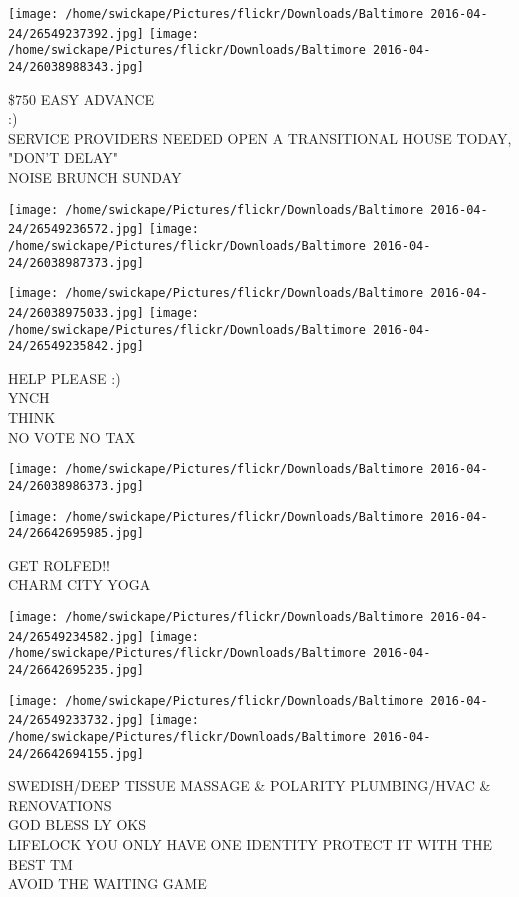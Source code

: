 \documentclass[10pt,letterpaper]{article}
\begin{document}
\texttt{[image: /home/swickape/Pictures/flickr/Downloads/Baltimore 2016-04-24/26549237392.jpg]}
\texttt{[image: /home/swickape/Pictures/flickr/Downloads/Baltimore 2016-04-24/26038988343.jpg]}

\$750 EASY ADVANCE\\
:)\\
SERVICE PROVIDERS NEEDED OPEN A TRANSITIONAL HOUSE TODAY, "DON'T DELAY"\\
NOISE BRUNCH SUNDAY
\pagebreak

\texttt{[image: /home/swickape/Pictures/flickr/Downloads/Baltimore 2016-04-24/26549236572.jpg]}
\texttt{[image: /home/swickape/Pictures/flickr/Downloads/Baltimore 2016-04-24/26038987373.jpg]}

\texttt{[image: /home/swickape/Pictures/flickr/Downloads/Baltimore 2016-04-24/26038975033.jpg]}
\texttt{[image: /home/swickape/Pictures/flickr/Downloads/Baltimore 2016-04-24/26549235842.jpg]}

HELP PLEASE :)\\
YNCH\\
THINK\\
NO VOTE NO TAX
\pagebreak

\texttt{[image: /home/swickape/Pictures/flickr/Downloads/Baltimore 2016-04-24/26038986373.jpg]}

\vspace{0.25in}
\texttt{[image: /home/swickape/Pictures/flickr/Downloads/Baltimore 2016-04-24/26642695985.jpg]}

GET ROLFED!!\\
CHARM CITY YOGA
\pagebreak

\texttt{[image: /home/swickape/Pictures/flickr/Downloads/Baltimore 2016-04-24/26549234582.jpg]}
\texttt{[image: /home/swickape/Pictures/flickr/Downloads/Baltimore 2016-04-24/26642695235.jpg]}

\texttt{[image: /home/swickape/Pictures/flickr/Downloads/Baltimore 2016-04-24/26549233732.jpg]}
\texttt{[image: /home/swickape/Pictures/flickr/Downloads/Baltimore 2016-04-24/26642694155.jpg]}

SWEDISH/DEEP TISSUE MASSAGE \& POLARITY PLUMBING/HVAC \& RENOVATIONS\\
GOD BLESS LY OKS\\
LIFELOCK YOU ONLY HAVE ONE IDENTITY PROTECT IT WITH THE BEST TM\\
AVOID THE WAITING GAME
\pagebreak
\end{document}
